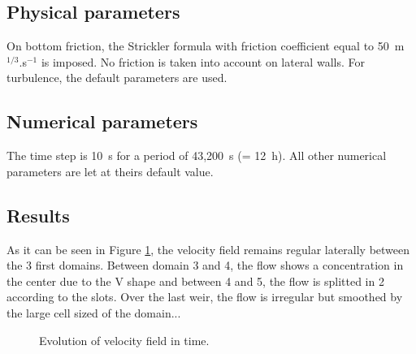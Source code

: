 \subsection{Physical parameters}

On  bottom friction, the Strickler formula
with friction coefficient equal to
50~m$^{1/3}$.s$^{-1}$ is imposed.
No friction is taken into account on lateral walls.
For turbulence, the default parameters are used.

\subsection{Numerical parameters}

The time step is 10~s for a period of 43,200~s (= 12~h).
All other numerical parameters are let at theirs default value.

\subsection{Results}

As it can be seen in Figure \ref{t2d:weirs2:velocity},
the velocity field remains regular laterally between the 3 first domains.
Between domain 3 and 4, the flow shows a concentration in the center due to the
V shape and between 4 and 5, the flow is splitted in 2 according to the slots.
Over the last weir, the flow is irregular but smoothed by the large cell sized
of the domain...

\begin{figure}[!htbp]
\begin{minipage}[t]{0.50\textwidth}
 \centering
\end{minipage}
\begin{minipage}[t]{0.50\textwidth}
 \centering
\end{minipage}
\begin{minipage}[t]{0.50\textwidth}
 \centering
\end{minipage}
\begin{minipage}[t]{0.50\textwidth}
 \centering
\end{minipage}
\begin{minipage}[t]{0.50\textwidth}
 \centering
\end{minipage}
\begin{minipage}[t]{0.50\textwidth}
 \centering
\end{minipage}
\begin{minipage}[t]{0.50\textwidth}
 \centering
\end{minipage}
 \caption{Evolution of velocity field in time.}
 \label{t2d:weirs2:velocity}
\end{figure}

